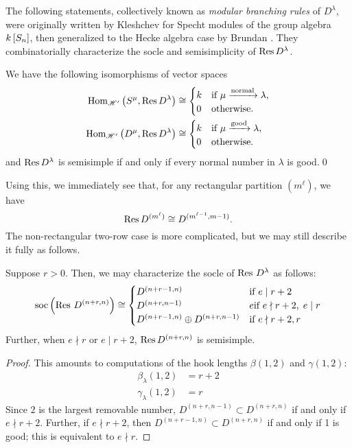 \documentclass{amsart}
\begin{document}
  The following statements, collectively known as \emph{modular branching rules} of $D^\lambda$, were originally written by Kleshchev for Specht modules of the group algebra $k\left[ S_n \right]$, then generalized to the Hecke algebra case by Brundan \cite{Kleshchev,Brundan}. 
  They combinatorially characterize the socle and semisimplicity of $\operatorname{Res} D^\lambda$.
  \begin{theorem}
    We have the following isomorphisms of vector spaces
    \begin{align*}
      \operatorname{Hom}_{\mathscr{H}'}\left( S^\mu,\operatorname{Res} D^\lambda \right) 
      &\cong \begin{cases}
        k & \text{if }\mu \xrightarrow{\text{normal}} \lambda,\\
        0 & \text{otherwise}.
      \end{cases}\\
      \operatorname{Hom}_{\mathscr{H}'}\left( D^\mu,\operatorname{Res} D^\lambda \right) 
      &\cong \begin{cases}
        k & \text{if } \mu \xrightarrow{\text{good}} \lambda,\\
        0 & \text{otherwise}.
      \end{cases}
    \end{align*}
    and $\operatorname{Res} D^\lambda$ is semisimple if and only if every normal number in $\lambda$ is good.\qed
  \end{theorem}

  Using this, we immediately see that, for any rectangular partition $(m^\ell)$, we have
  \[
    \operatorname{Res} D^{(m^\ell)} \cong D^{(m^{\ell-1},m-1)}.
  \]
  The non-rectangular two-row case is more complicated, but we may still describe it fully as follows.
  \begin{corollary}\label{D Restrictions}
    Suppose $r > 0$.
    Then, we may characterize the socle of $\operatorname{Res} \, D^\lambda$ as follows:
    \[
      \operatorname{soc}\left( \operatorname{Res} \, D^{(n+r,n)} \right) \cong \begin{cases}
        D^{(n + r - 1,n)} & \text{if }e \mid r+2\\
        D^{(n + r,n-1)} &e \text{if }e\nmid r+2, \; e \mid r\\
        D^{(n+r-1,n)} \oplus D^{(n+r,n-1)} & \text{if } e \nmid r+2,r
      \end{cases}
    \]
    Further, when $e \nmid r$ or $e \mid r + 2$, $\operatorname{Res} D^{(n+r,n)}$ is semisimple.
  \end{corollary}
  \begin{proof}
    This amounts to computations of the hook lengths $\beta(1,2)$ and $\gamma(1,2)$:
    \begin{align*}
      \beta_\lambda(1,2) &= r + 2\\
      \gamma_\lambda(1,2) &= r
    \end{align*}
    Since $2$ is the largest removable number, $D^{(n+r,n-1)} \subset D^{(n+r,n)}$ if and only if $e \nmid r + 2$.
    Further, if $e \nmid r + 2$, then $D^{(n+r-1,n)} \subset D^{(n+r,n)}$ if and only if 1 is good;
    this is equivalent to $e \nmid r$.
  \end{proof}
\end{document}
